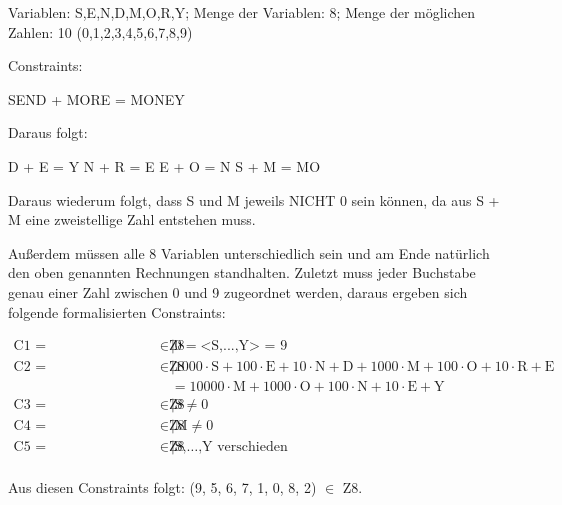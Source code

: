\documentclass[ngerman]{fbi-aufgabenblatt}
\begin{document}

Variablen: S,E,N,D,M,O,R,Y;
Menge der Variablen: 8;
Menge der möglichen Zahlen: 10 (0,1,2,3,4,5,6,7,8,9)

Constraints:

SEND + MORE = MONEY

Daraus folgt:

D + E = Y
N + R = E
E + O = N
S + M = MO

Daraus wiederum folgt, dass S und M jeweils NICHT 0 sein können, da aus S + M eine zweistellige Zahl entstehen muss.

Außerdem müssen alle 8 Variablen unterschiedlich sein und am Ende natürlich den oben genannten Rechnungen standhalten. Zuletzt muss jeder Buchstabe genau einer Zahl zwischen 0 und 9 zugeordnet werden, daraus ergeben sich folgende formalisierten Constraints:

\begin{align*}
\text{C1 = (S,E,N,D,M,O,R,Y)} 	\in \text{Z8} &| 0 = \text{<S,...,Y> = 9}\\
\text{C2 = (S,E,N,D,M,O,R,Y)} 	\in \text{Z8} &| 1000 \cdot \text{S} + 100 \cdot \text{E} + 10 \cdot \text{N} + \text{D} + 1000 \cdot \text{M} + 100 \cdot \text{O} + 10 \cdot \text{R} + \text{E}\\
& = 10000 \cdot \text{M} + 1000 \cdot \text{O} + 100 \cdot \text{N} + 10 \cdot \text{E} + \text{Y}\\
\text{C3 = (S,E,N,D,M,O,R,Y)} \in \text{Z8} &| \text{S} \neq 0 \\
\text{C4 = (S,E,N,D,M,O,R,Y)} \in \text{Z8} &| \text{M} \neq 0 \\
\text{C5 = (S,E,N,D,M,O,R,Y)} \in \text{Z8} &| \text{S,…,Y verschieden} \\
\end{align*}

Aus diesen Constraints folgt: (9, 5, 6, 7, 1, 0, 8, 2) \(\in\) Z8.

\begin{comment}
$C1 ={ (S,E,N,D,M,O,R,Y) \in Z8 | 0 =< S,…,Y >= 9 }$

$C2 = { (S,E,N,D,M,O,R,Y) \in Z8 | 1000 * S + 100 * E + 10 * N + D
					        +1000 * M + 100 * O + 10 * R + E
			   = 10000 * M + 1000 * O + 100 * N + 10 * E + Y }$
			   
$C3 = { (S,E,N,D,M,O,R,Y) \in Z8 | S != 0 }$

$C4 = { (S,E,N,D,M,O,R,Y) \in Z8 | M != 0 }$

$C5 = { (S,E,N,D,M,O,R,Y) \in Z8 | S,…,Y verschieden }$

$Aus diesen Constraints folgt: (9,5,6,7,1,0,8,2) \in Z8$
\end{comment}
\end{document}
